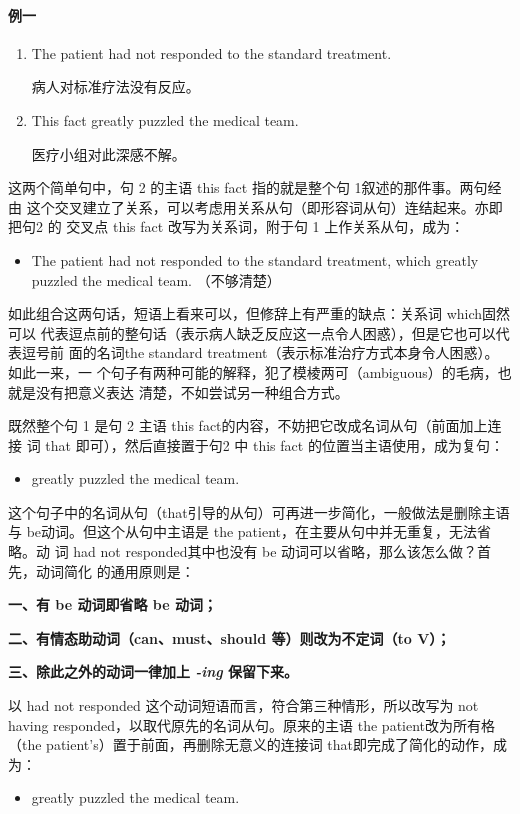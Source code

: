 \paragraph{例一}

\begin{enumerate}
\item The patient had not responded to the standard treatment.

  病人对标准疗法没有反应。
\item This fact greatly puzzled the medical team.

  医疗小组对此深感不解。
\end{enumerate}

这两个简单句中，句 2 的主语 this fact 指的就是整个句 1叙述的那件事。两句经由
这个交叉建立了关系，可以考虑用关系从句（即形容词从句）连结起来。亦即把句2 的
交叉点 this fact 改写为关系词，附于句 1 上作关系从句，成为：
\begin{itemize}
\item The patient had not responded to the standard treatment, which greatly
  puzzled the medical team. （不够清楚）
\end{itemize}

如此组合这两句话，短语上看来可以，但修辞上有严重的缺点：关系词 which固然可以
代表逗点前的整句话（表示病人缺乏反应这一点令人困惑），但是它也可以代表逗号前
面的名词the standard treatment（表示标准治疗方式本身令人困惑）。如此一来，一
个句子有两种可能的解释，犯了模棱两可（ambiguous）的毛病，也就是没有把意义表达
清楚，不如尝试另一种组合方式。

既然整个句 1 是句 2 主语 this fact的内容，不妨把它改成名词从句（前面加上连接
词 that 即可），然后直接置于句2 中 this fact 的位置当主语使用，成为复句：
\begin{itemize}
\item {} greatly
  puzzled the medical team.
\end{itemize}
这个句子中的名词从句（that引导的从句）可再进一步简化，一般做法是删除主语
与 be动词。但这个从句中主语是 the patient，在主要从句中并无重复，无法省略。动
词 had not responded其中也没有 be 动词可以省略，那么该怎么做？首先，动词简化
的通用原则是：

\textbf{一、有 be 动词即省略 be 动词；}

\textbf{二、有情态助动词（can、must、should 等）则改为不定词（to V）；}

\textbf{三、除此之外的动词一律加上 \emph{-ing} 保留下来。}

以 had not responded 这个动词短语而言，符合第三种情形，所以改写为 not having
responded，以取代原先的名词从句。原来的主语 the patient改为所有格（the
patient's）置于前面，再删除无意义的连接词 that即完成了简化的动作，成为：
\begin{itemize}
\item {}
  greatly puzzled the medical team.
\end{itemize}

